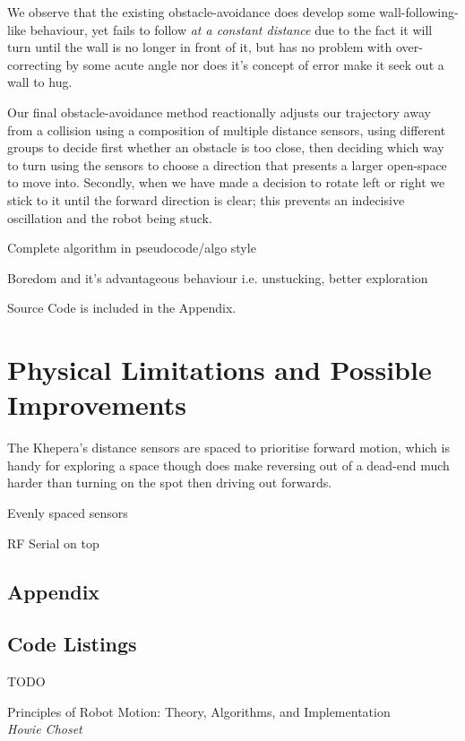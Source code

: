 \documentclass[11pt, a4paper]{article}
\begin{document}
We observe that the existing obstacle-avoidance does develop some wall-following-like 
behaviour, yet fails to follow \emph{at a constant distance} due to the fact it will 
turn until the wall is no longer in front of it, but has no problem with over-correcting 
by some acute angle nor does it's concept of error make it seek out a wall to hug.

Our final obstacle-avoidance method reactionally adjusts our trajectory away from a 
collision using a composition of multiple distance sensors, using different groups to 
decide first whether an obstacle is too close, then deciding which way to turn using 
the sensors to choose a direction that presents a larger open-space to move into.
Secondly, when we have made a decision to rotate left or right we stick to it until 
the forward direction is clear; this prevents an indecisive oscillation and the robot 
being stuck.

Complete algorithm in pseudocode/algo style

Boredom and it's advantageous behaviour i.e. unstucking, better exploration

Source Code is included in the Appendix.


\section{Physical Limitations and Possible Improvements}

The Khepera's distance sensors are spaced to prioritise forward motion, which is handy 
for exploring a space though does make reversing out of a dead-end much harder than 
turning on the spot then driving out forwards.

Evenly spaced sensors

RF Serial on top




\begin{appendices}
\section*{Appendix}
\subsection{Code Listings}
TODO
%
\end{appendices}


\begin{thebibliography}{1}

Principles of Robot Motion: Theory, Algorithms, and Implementation\\
\textit{Howie Choset}

\end{thebibliography}
\end{document}
